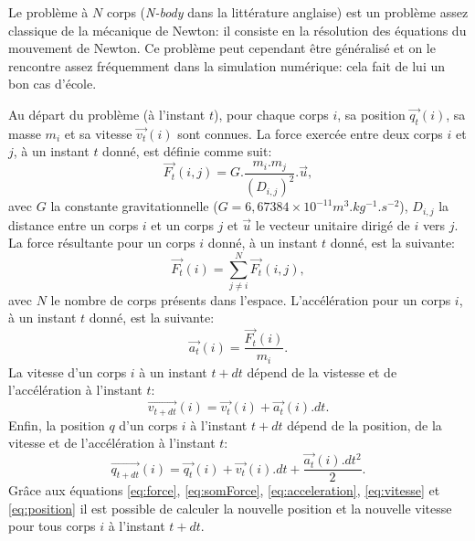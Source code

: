 Le problème à $N$ corps (\textit{N-body} dans la littérature anglaise) est un problème assez classique de la mécanique de {\sc Newton}: il consiste en la résolution des équations du mouvement de {\sc Newton}. 
Ce problème peut cependant être généralisé et on le rencontre assez fréquemment dans la simulation numérique: cela fait de lui un bon cas d'école.

Au départ du problème (à l'instant $t$), pour chaque corps $i$, sa position $\vec{q_t}(i)$, sa masse $m_i$ et sa vitesse $\vec{v_t}(i)$ sont connues.
La force exercée entre deux corps $i$ et $j$, à un instant $t$ donné, est définie comme suit:
\begin{equation}
\label{eq:force}
	\vec{F_t}(i,j) = G.\frac{m_i.m_j}{(D_{i,j})^2}.\vec{u},
\end{equation}
avec $G$ la constante gravitationnelle ($G = 6,67384\times10^{-11} m^3.kg^{-1}.s^{-2}$), $D_{i,j}$ la distance entre un corps $i$ et un corps $j$ et $\vec{u}$ le vecteur unitaire dirigé de $i$ vers $j$.
La force résultante pour un corps $i$ donné, à un instant $t$ donné, est la suivante:
\begin{equation}
\label{eq:somForce}
	\vec{F_t}(i) = \sum_{j \ne i}^{N} \vec{F_t}(i,j),
\end{equation}
avec $N$ le nombre de corps présents dans l'espace.
L'accélération pour un corps $i$, à un instant $t$ donné, est la suivante:
\begin{equation}
\label{eq:acceleration}
	\vec{a_t}(i) = \frac{\vec{F_t}(i)}{m_i}.
\end{equation}
La vitesse d'un corps $i$ à un instant $t + dt$ dépend de la vistesse et de l'accélération à l'instant $t$:
\begin{equation}
\label{eq:vitesse}
	\vec{v_{t+dt}}(i) = \vec{v_{t}}(i) + \vec{a_t}(i).dt.
\end{equation}
Enfin, la position $q$ d'un corps $i$ à l'instant $t + dt$ dépend de la position, de la vitesse et de l'accélération à l'instant $t$:
\begin{equation}
\label{eq:position}
	\vec{q_{t+dt}}(i) = \vec{q_{t}}(i) + \vec{v_{t}}(i).dt + \frac{\vec{a_t}(i).dt^2}{2}.
\end{equation}
Grâce aux équations \ref{eq:force}, \ref{eq:somForce}, \ref{eq:acceleration}, \ref{eq:vitesse} et \ref{eq:position} il est possible de calculer la nouvelle position et la nouvelle vitesse pour tous corps $i$ à l'instant $t + dt$.

